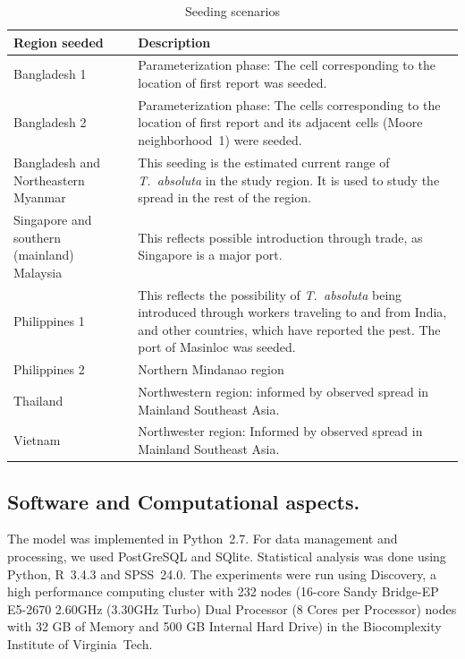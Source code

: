 \documentclass[10pt]{article}
\theoremstyle{definition}
\newcommand{\tuta}{\emph{T.~absoluta}}
\begin{document}
\begin{table}[ht]
    \caption{Seeding scenarios\label{tab:seed}}
    \centering
    \small
    \begin{tabular}{p{4cm} p{10cm}}
    	\hline
    	Region seeded & Description \\
    	\hline
    	\hline
        Bangladesh 1 & Parameterization phase: The cell corresponding to the location of first
        report was seeded. \\
        Bangladesh 2 & Parameterization phase: The cells corresponding to the location of first
        report and its adjacent cells (Moore neighborhood~1) were seeded. \\
    	\hline
	Bangladesh and Northeastern Myanmar & This seeding is the estimated
	current range of \tuta{} in the study region. It is used to study
	the spread in the rest of the region.\\
    	\hline
    	Singapore and southern (mainland) Malaysia & This reflects possible introduction through trade, as Singapore is a major port.\\
    	\hline
    	Philippines 1 & This reflects the possibility of \tuta{} being
        introduced through workers traveling to and from India, and other
        countries, which have reported the pest. The port of Masinloc was
        seeded.\\
    	Philippines 2 & Northern Mindanao region\\
    	Thailand & Northwestern region: informed by observed spread in
        Mainland Southeast Asia.\\
    	Vietnam & Northwester region: Informed by observed spread in
        Mainland Southeast Asia.\\
    	\hline
    	\end{tabular}
\end{table}
\subsection{Software and Computational aspects.} The model was implemented
in Python~2.7. For data management and processing, we used PostGreSQL and
SQlite.  Statistical analysis was done using Python, R~3.4.3 and SPSS~24.0.
The experiments were run using Discovery, a high performance computing
cluster with 232 nodes (16-core Sandy Bridge-EP E5-2670 2.60GHz (3.30GHz
Turbo) Dual Processor (8 Cores per Processor) nodes with 32 GB of Memory
and 500 GB Internal Hard Drive) in the Biocomplexity Institute of Virginia~Tech.
\end{document}
